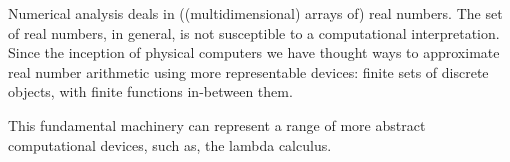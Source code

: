 Numerical analysis deals in ((multidimensional) arrays of) real numbers. The
set of real numbers, in general, is not susceptible to a computational
interpretation\cite{turing-1936-7-computability}. Since the inception of
physical computers we have thought ways to approximate real number arithmetic
using more representable devices: finite sets of discrete objects, with finite
functions in-between them.

This fundamental machinery can represent a range of more abstract computational
devices, such as, the lambda calculus.
